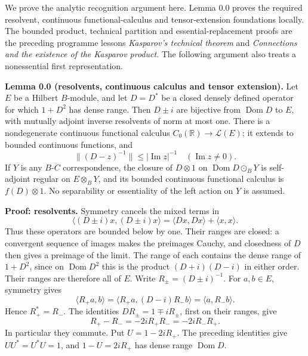 \documentclass[
  11pt,
]{article}
\begin{document}
We prove the analytic recognition argument here. Lemma 0.0 proves the
required resolvent, continuous functional-calculus and tensor-extension
foundations locally. The bounded product, technical partition and
essential-replacement proofs are the preceding programme lessons
\emph{Kasparov's technical theorem} and \emph{Connections and the
existence of the Kasparov product}. The following argument also treats a
nonessential first representation.

\textbf{Lemma 0.0 (resolvents, continuous calculus and tensor
extension).} Let \(E\) be a Hilbert \(B\)-module, and let \(D=D^*\) be a
closed densely defined operator for which \(1+D^2\) has dense range.
Then \(D\pm i\) are bijective from \(\operatorname{Dom}D\) to \(E\),
with mutually adjoint inverse resolvents of norm at most one. There is a
nondegenerate continuous functional calculus
\(C_0(\mathbb R)\to\mathcal L(E)\); it extends to bounded continuous
functions, and \[
\|(D-z)^{-1}\|\leq |\operatorname{Im}z|^{-1}
\quad(\operatorname{Im}z\ne0).
\] If \(Y\) is any \(B\)-\(C\) correspondence, the closure of
\(D\otimes1\) on \(\operatorname{Dom}D\odot_B Y\) is self-adjoint
regular on \(E\otimes_B Y\), and its bounded continuous functional
calculus is \(f(D)\otimes1\). No separability or essentiality of the
left action on \(Y\) is assumed.

\textbf{Proof: resolvents.} Symmetry cancels the mixed terms in \[
\langle(D\pm i)x,(D\pm i)x\rangle
=\langle Dx,Dx\rangle+\langle x,x\rangle.
\] Thus these operators are bounded below by one. Their ranges are
closed: a convergent sequence of images makes the preimages Cauchy, and
closedness of \(D\) then gives a preimage of the limit. The range of
each contains the dense range of \(1+D^2\), since on
\(\operatorname{Dom}D^2\) this is the product \((D+i)(D-i)\) in either
order. Their ranges are therefore all of \(E\). Write
\(R_\pm=(D\pm i)^{-1}\). For \(a,b\in E\), symmetry gives \[
\langle R_+a,b\rangle
=\langle R_+a,(D-i)R_-b\rangle
=\langle a,R_-b\rangle.
\] Hence \(R_+^*=R_-\). The identities \(DR_\pm=1\mp iR_\pm\), first on
their ranges, give \[
R_+-R_-=-2iR_+R_-=-2iR_-R_+.
\] In particular they commute. Put \(U=1-2iR_+\). The preceding
identities give \(UU^*=U^*U=1\), and \(1-U=2iR_+\) has dense range
\(\operatorname{Dom}D\).
\end{document}
